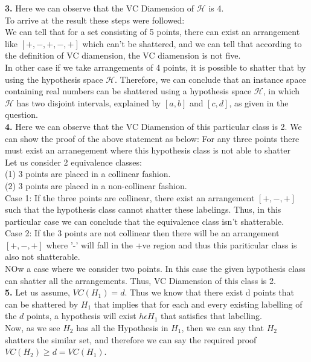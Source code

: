 \documentclass[11pt]{article}
\begin{document}
{\bf 3.} Here we can observe that the VC Diamension of $\mathcal {H}$ is 4.\\
To arrive at the result these steps were followed:\\
We can tell that for a set consisting of 5 points, there can exist an arrangement like $[+,-,+,-,+]$ which can't be shattered, and we can tell that according to the definition of VC diamension, the VC diamension is not five.\\
In other case if we take arrangements of 4 points, it is possible to shatter that by using the hypothesis space $\mathcal {H}$. Therefore, we can conclude that an instance space containing real numbers can be shattered using a hypothesis space $\mathcal {H}$, in which $\mathcal {H}$ has two disjoint intervals, explained by $[a,b]$ and $[c,d]$, as given in the question.\\[10pt]
{\bf 4.} Here we can observe that the VC Diamension of this particular class is 2. We can show the proof of the above statement as below: For any three points there must exist an arranegement where this hypothesis class is not able to shatter\\
Let us consider 2 equivalence classes:\\
(1) 3 points are placed in a collinear fashion.\\
(2) 3 points are placed in a non-collinear fashion.\\
Case 1: If the three points are collinear, there exist an arrangement $[+,-,+]$ such that the hypothesis class cannot shatter these labelings. Thus, in this particular case we can conclude that the equivalence class isn't shatterable.\\
Case 2: If the 3 points are not collinear then there will be an arrangement $[+,-,+]$ where '-' will fall in the +ve region and thus this pariticular class is also not shatterable.\\
NOw a case where we consider two points. In this case the given hypothesis class can shatter all the arrangements. Thus, VC Diamension of this class is 2.\\[10pt]  

{\bf 5.} Let us assume, $VC(H_{1}) = d$. Thus we know that there exist d points that can be shattered by $H_{1}$ that implies that for each and every existing labelling of the $d$ points, a hypothesis will exist $h \epsilon H_{1}$ that satisfies that labelling. \\
Now, as we see $H_{2}$ has all the Hypothesis in $H_{1}$, then we can say that $H_{2}$ shatters the similar set, and therefore we can say the required proof $VC (H_{2}) \geq d = VC (H_{1})$.    
\end{document}
